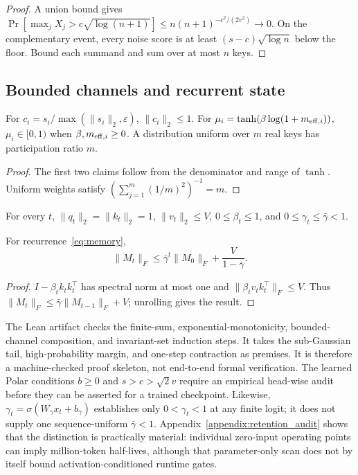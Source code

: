 \begin{proof}
A union bound gives $\Pr[\max_jX_j>c\sqrt{\log(n+1)}]\leq n(n+1)^{-c^2/(2v^2)}\to0$. On the complementary event, every noise score is at least $(s-c)\sqrt{\log n}$ below the floor. Bound each summand and sum over at most $n$ keys.
\end{proof}

\subsection{Bounded channels and recurrent state}

\begin{proposition}
For $c_i=s_i/\max(\lVert s_i\rVert_2,\varepsilon)$, $\lVert c_i\rVert_2\leq1$. For $\mu_i=\tanh(\beta\log(1+m_{{\rm eff},i}))$, $\mu_i\in[0,1)$ when $\beta,m_{{\rm eff},i}\geq0$. A distribution uniform over $m$ real keys has participation ratio $m$.
\end{proposition}

\begin{proof}
The first two claims follow from the denominator and range of $\tanh$. Uniform weights satisfy $(\sum_{j=1}^m(1/m)^2)^{-1}=m$.
\end{proof}

\begin{assumption}
For every $t$, $\lVert q_t\rVert_2=\lVert k_t\rVert_2=1$, $\lVert v_t\rVert_2\leq V$, $0\leq\beta_t\leq1$, and $0\leq\gamma_t\leq\bar\gamma<1$.
\end{assumption}

\begin{proposition}
For recurrence~\eqref{eq:memory},
\begin{equation}
\lVert M_t\rVert_F\leq\bar\gamma^t\lVert M_0\rVert_F+\frac{V}{1-\bar\gamma}.
\end{equation}
\end{proposition}

\begin{proof}
$I-\beta_tk_tk_t^\top$ has spectral norm at most one and $\lVert\beta_tv_tk_t^\top\rVert_F\leq V$. Thus $\lVert M_t\rVert_F\leq\bar\gamma\lVert M_{t-1}\rVert_F+V$; unrolling gives the result.
\end{proof}

The Lean artifact checks the finite-sum, exponential-monotonicity, bounded-channel composition, and invariant-set induction steps. It takes the sub-Gaussian tail, high-probability margin, and one-step contraction as premises. It is therefore a machine-checked proof skeleton, not end-to-end formal verification. The learned Polar conditions $b\geq0$ and $s>c>\sqrt2v$ require an empirical head-wise audit before they can be asserted for a trained checkpoint. Likewise, $\gamma_t=\sigma(W_\gamma x_t+b_\gamma)$ establishes only $0<\gamma_t<1$ at any finite logit; it does not supply one sequence-uniform $\bar\gamma<1$. Appendix~\ref{appendix:retention_audit} shows that the distinction is practically material: individual zero-input operating points can imply million-token half-lives, although that parameter-only scan does not by itself bound activation-conditioned runtime gates.


